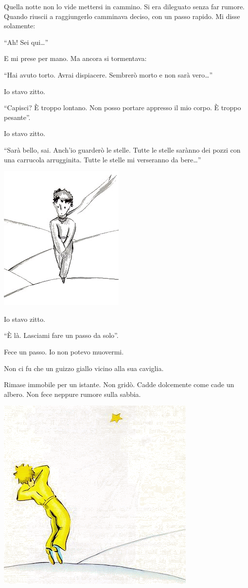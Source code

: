 \documentclass[11pt]{scrbook}
\begin{document}
Quella notte non lo vide mettersi in cammino. Si era dileguato senza far rumore. Quando riuscii a raggiungerlo camminava deciso, con un passo rapido. Mi disse solamente:

``Ah! Sei qui\ldots{}''

E mi prese per mano. Ma ancora si tormentava:

``Hai avuto torto. Avrai dispiacere. Sembrerò morto e non sarà vero\ldots{}''

Io stavo zitto.

``Capisci? È troppo lontano. Non posso portare appresso il mio corpo. È troppo pesante''.

Io stavo zitto.

``Sarà bello, sai. Anch'io guarderò le stelle. Tutte le stelle sarànno dei pozzi con una carrucola arrugginita. Tutte le stelle mi verseranno da bere\ldots{}''

\begin{center}
\includegraphics{img/26c}
\end{center}

Io stavo zitto.

``È là. Lasciami fare un passo da solo''.

Fece un passo. Io non potevo muovermi.

Non ci fu che un guizzo giallo vicino alla sua caviglia.

Rimase immobile per un istante. Non gridò. Cadde dolcemente come cade un albero. Non fece neppure rumore sulla sabbia.

\begin{center}
\includegraphics{img/zlaty}
\end{center}
\end{document}
